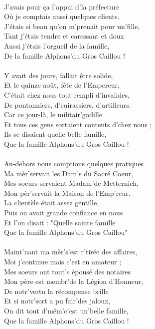 \\J'avais pour ça l'appui d'la préfecture
\\Où je comptais aussi quelques clients.
\\J'étais si beau qu'on m'prenait pour un'fille,
\\Tant j'étais tendre et caressant et doux
\\Aussi j'étais l'orgueil de la famille,
\\De la famille Alphons'du Gros Caillou !
\\\\Y avait des jours, fallait être solide,
\\Et le quinze août, fête de l'Empereur,
\\C'était chez nous tout rempli d'invalides,
\\De pontonniers, d'cuirassiers, d'artilleurs.
\\Car ce jour-là, le militair'godille
\\Et tous ces gens sortaient contents d'chez nous ;
\\Ils se disaient quelle belle famille,
\\Que la famille Alphons'du Gros Caillou !
\\\\Au-dehors nous comptions quelques pratiques
\\Ma mèr'servait les Dam's du Sacré Coeur,
\\Mes soeurs servaient Madam'de Metternich,
\\Mon pèr'servait la Maison de l'Emp'reur.
\\La clientèle était assez gentille,
\\Puis on avait grande confiance en nous
\\Et l'on disait : "Quelle sainte famille
\\Que la famille Alphons'du Gros Caillou"
\\\\Maint'nant ma mèr's'est r'tirée des affaires,
\\Moi j'continue mais c'est en amateur ;
\\Mes soeurs ont tout's épousé des notaires
\\Mon père est membr'de la Légion d'Honneur,
\\De notr'vertu la récompense brille
\\Et si notr'sort a pu fair'des jaloux,
\\On dit tout d'mêm'c'est un'belle famille,
\\Que la famille Alphons'du Gros Caillou !
\breakpage
